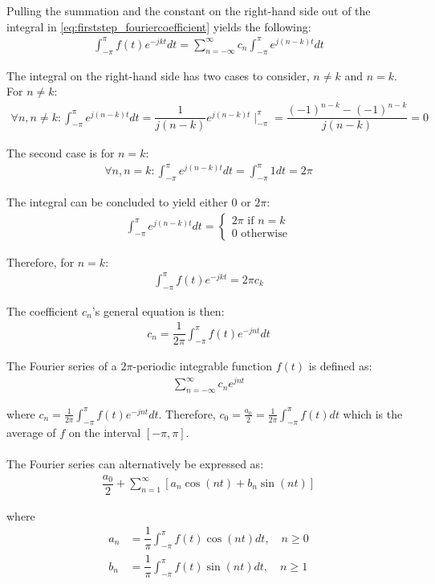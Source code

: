 Pulling the summation and the constant on the right-hand side out of the integral in \eqref{eq:firststep_fouriercoefficient} yields the following:
\begin{align*}
\int_{-\pi}^\pi f(t) e^{-j k t}dt = \sum_{n=-\infty}^\infty c_n \int_{-\pi}^\pi e^{j (n-k) t}dt
\end{align*}

The integral on the right-hand side has two cases to consider, $n \neq k$ and $n = k$. For $n\neq k$:
\begin{align*}
	\forall n,n\neq k: \int_{-\pi}^\pi e^{j(n-k)t}dt 
	=\dfrac{1}{j(n-k)}e^{j(n-k)t}\mid_{-\pi}^{\pi}
	=\dfrac{(-1)^{n-k}-(-1)^{n-k}}{j(n-k)}
	=0
\end{align*}

The second case is for $n = k$:
\begin{align*}
	\forall n,n=k: \int_{-\pi}^\pi e^{j(n-k)t}dt = \int_{-\pi}^\pi 1 dt = 2\pi
\end{align*}

The integral can be concluded to yield either $0$ or $2\pi$:
\begin{align}
	\int_{-\pi}^{\pi} e^{j (n-k)t}dt 
	= 
	\begin{cases}
			2\pi \text{ if } n=k\\
			0 \text{ otherwise}
	\end{cases}
\end{align}

Therefore, for $n = k$:
\begin{align*}
\int_{-\pi}^\pi f(t)e^{-j k t} = 2\pi c_k
\end{align*}

The coefficient $c_n$'s general equation is then:
\begin{align*}
	c_n = \dfrac{1}{2\pi} \int_{-\pi}^{\pi} f(t) e^{-j n t}dt
\end{align*}

\begin{definition} \label{def:fourier_definition}
The Fourier series of a $2\pi$-periodic integrable function $f(t)$ is defined as:
\begin{align*}
	\sum_{n=-\infty}^\infty c_n e^{j n t}
\end{align*}

where $c_n = \frac{1}{2\pi}\int_{- \pi}^\pi f(t) e^{-j n t} dt$. Therefore, $c_0 = \frac{a_0}{2} = \frac{1}{2\pi} \int_{-\pi}^\pi f(t) dt$ which is the average of $f$ on the interval $[-\pi,\pi]$.
\\ \\
The Fourier series can alternatively be expressed as:
\begin{align*}
	\dfrac{a_0}{2} + \sum_{n=1}^{\infty} \left[ a_n \cos(n t) + b_n \sin(n t)\right]
\end{align*}

where
\begin{align*}
	a_n 
	&= \dfrac{1}{\pi} \int_{-\pi}^\pi f(t) \cos (n t) dt, \quad 	n \geq 0\\
	b_n
	&= \dfrac{1}{\pi} \int_{-\pi}^\pi f(t) \sin (n t) dt, \quad 	n \geq 1
\end{align*}
\end{definition}

